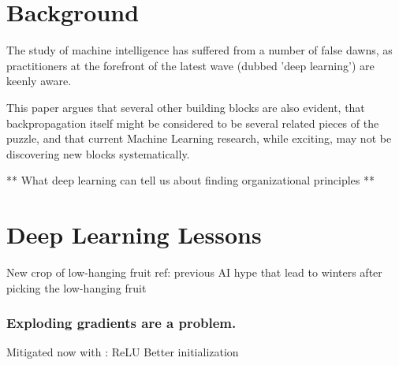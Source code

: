 \documentclass[citeauthoryear]{llncs}
\begin{document}
\section{Background}
The study of machine intelligence has suffered from a number of false dawns, 
as practitioners at the forefront of the latest wave (dubbed 'deep learning') 
are keenly aware.  

This paper argues that several other building blocks are also evident, 
that backpropagation itself might be considered to be several related pieces of the puzzle,
and that current Machine Learning research, while exciting, may not be
discovering new blocks systematically.

  
**  What deep learning can tell us about finding organizational principles ** 


%
%
%

\section{Deep Learning Lessons}

  New crop of low-hanging fruit 
    ref: previous AI hype that lead to winters after picking the low-hanging fruit

\subsubsection*{Exploding gradients are a problem.}
Mitigated now with :
  ReLU
  Better initialization
\end{document}
